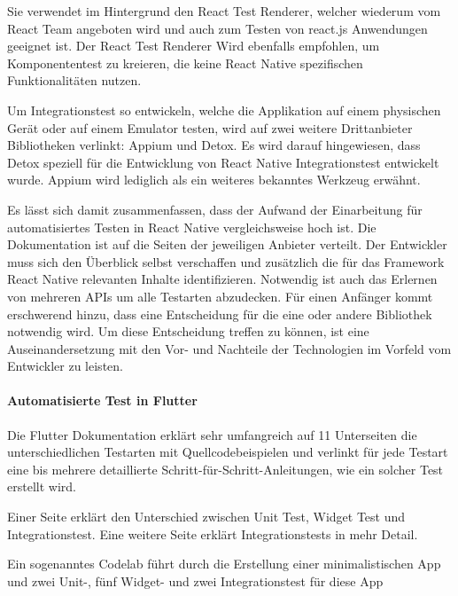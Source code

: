 Sie verwendet im Hintergrund den React Test Renderer, welcher wiederum vom React Team angeboten wird und auch zum Testen von react.js Anwendungen geeignet ist. Der React Test Renderer Wird ebenfalls empfohlen, um Komponententest zu kreieren, die keine React Native spezifischen Funktionalitäten nutzen.

Um Integrationstest so entwickeln, welche die Applikation auf einem physischen Gerät oder auf einem Emulator testen, wird auf zwei weitere Drittanbieter Bibliotheken verlinkt: Appium und Detox. Es wird darauf hingewiesen, dass Detox speziell für die Entwicklung von React Native Integrationstest entwickelt wurde. Appium wird lediglich als ein weiteres  bekanntes Werkzeug erwähnt. 

Es lässt sich damit zusammenfassen, dass der Aufwand der Einarbeitung für automatisiertes Testen in React Native vergleichsweise hoch ist. Die Dokumentation ist auf die Seiten der jeweiligen Anbieter verteilt. Der Entwickler muss sich den Überblick selbst verschaffen und zusätzlich die für das Framework React Native relevanten Inhalte identifizieren. Notwendig ist auch das Erlernen von mehreren APIs um alle Testarten abzudecken. Für einen Anfänger kommt erschwerend hinzu, dass eine Entscheidung für die eine oder andere Bibliothek notwendig wird. Um diese Entscheidung treffen zu können, ist eine Auseinandersetzung mit den Vor- und Nachteile der Technologien im Vorfeld vom Entwickler zu leisten.

\paragraph{Automatisierte Test in Flutter} Die Flutter Dokumentation erklärt sehr umfangreich auf 11 Unterseiten die unterschiedlichen Testarten mit Quellcodebeispielen und verlinkt für jede Testart eine bis mehrere detaillierte Schritt-für-Schritt-Anleitungen, wie ein solcher Test erstellt wird.

Einer Seite erklärt den Unterschied zwischen Unit Test, Widget Test und Integrationstest. Eine weitere Seite erklärt Integrationstests in mehr Detail. 

Ein sogenanntes Codelab führt durch die Erstellung einer minimalistischen App und zwei Unit-, fünf Widget- und zwei Integrationstest für diese App


